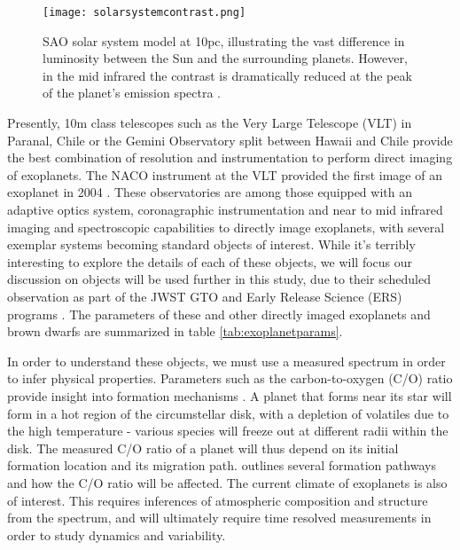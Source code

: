 \begin{figure}[t]
	\centering
	\texttt{[image: solarsystemcontrast.png]}
	\caption{SAO solar system model at 10pc, illustrating the vast difference in luminosity between the Sun and the surrounding planets. However, in the mid infrared the contrast is dramatically reduced at the peak of the planet's emission spectra \parencite{DesMarais2002}.}
	\label{fig:solarsystem}
\end{figure}
Presently, 10m class telescopes such as the Very Large Telescope (VLT) in Paranal, Chile or the Gemini Observatory split between Hawaii and Chile provide the best combination of resolution and instrumentation to perform direct imaging of exoplanets.
The NACO instrument at the VLT provided the first image of an exoplanet in 2004 \parencite{Chauvin2004}.
These observatories are among those equipped with an adaptive optics system, coronagraphic instrumentation and near to mid infrared imaging and spectroscopic capabilities to directly image exoplanets, with several exemplar systems becoming standard objects of interest.
While it's terribly interesting to explore the details of each of these objects, we will focus our discussion on objects will be used further in this study, due to their scheduled observation as part of the JWST GTO and Early Release Science (ERS) programs \parencite{Beichman2019}. 
The parameters of these and other directly imaged exoplanets and brown dwarfs are summarized in table \ref{tab:exoplanetparams}. 

In order to understand these objects, we must use a measured spectrum in order to infer physical properties.
Parameters such as the carbon-to-oxygen (C/O) ratio provide insight into formation mechanisms \parencite{Madhusudhan2012}.
A planet that forms near its star will form in a hot region of the circumstellar disk, with a depletion of volatiles due to the high temperature - various species will freeze out at different radii within the disk. 
The measured C/O ratio of a planet will thus depend on its initial formation location and its migration path.
\parencite{Turrini2015} outlines several formation pathways and how the C/O ratio will be affected.
The current climate of exoplanets is also of interest. This requires inferences of atmospheric composition and structure from the spectrum, and will ultimately require time resolved measurements in order to study dynamics and variability. 


